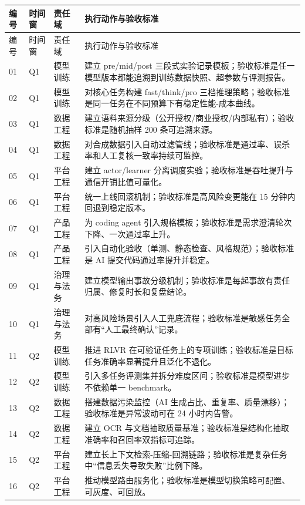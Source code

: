 \documentclass[a4paper]{article}
\begin{document}
\begin{longtable}{p{}p{}p{}p{}}
\toprule
编号 & 时间窗 & 责任域 & 执行动作与验收标准 \\
\midrule
\endfirsthead
\toprule
编号 & 时间窗 & 责任域 & 执行动作与验收标准 \\
\midrule
\endhead
01 & Q1 & 模型训练 & 建立 pre/mid/post 三段式实验记录模板；验收标准是任一模型版本都能追溯到训练数据快照、超参数与评测报告。 \\
02 & Q1 & 模型训练 & 对核心任务构建 fast/think/pro 三档推理策略；验收标准是同一任务在不同预算下有稳定性能-成本曲线。 \\
03 & Q1 & 数据工程 & 建立语料来源分级（公开授权/商业授权/内部私有）；验收标准是随机抽样 200 条可追溯来源。 \\
04 & Q1 & 数据工程 & 对合成数据引入自动过滤管线；验收标准是通过率、误杀率和人工复核一致率持续可监控。 \\
05 & Q1 & 平台工程 & 建立 actor/learner 分离调度实验；验收标准是吞吐提升与通信开销比值可量化。 \\
06 & Q1 & 平台工程 & 统一上线回滚机制；验收标准是高风险变更能在 15 分钟内回退到稳定版本。 \\
07 & Q1 & 产品工程 & 为 coding agent 引入规格模板；验收标准是需求澄清轮次下降、一次通过率上升。 \\
08 & Q1 & 产品工程 & 引入自动化验收（单测、静态检查、风格规范）；验收标准是 AI 提交代码通过率提升并稳定。 \\
09 & Q1 & 治理与法务 & 建立模型输出事故分级机制；验收标准是每起事故有责任归属、修复时长和复盘结论。 \\
10 & Q1 & 治理与法务 & 对高风险场景引入人工兜底流程；验收标准是敏感任务全部有“人工最终确认”记录。 \\
11 & Q2 & 模型训练 & 推进 RLVR 在可验证任务上的专项训练；验收标准是目标任务准确率显著提升且泛化不退化。 \\
12 & Q2 & 模型训练 & 引入多任务评测集并拆分难度区间；验收标准是模型进步不依赖单一 benchmark。 \\
13 & Q2 & 数据工程 & 搭建数据污染监控（AI 生成占比、重复率、质量漂移）；验收标准是异常波动可在 24 小时内告警。 \\
14 & Q2 & 数据工程 & 建立 OCR 与文档抽取质量基准；验收标准是结构化抽取准确率和召回率双指标可追踪。 \\
15 & Q2 & 平台工程 & 建立长上下文检索-压缩-回溯链路；验收标准是复杂任务中“信息丢失导致失败”比例下降。 \\
16 & Q2 & 平台工程 & 推动模型路由服务化；验收标准是模型切换策略可配置、可灰度、可回放。 \\

\end{longtable}
\end{document}
